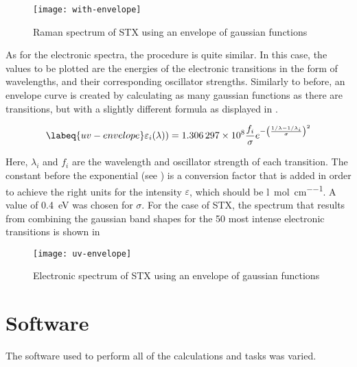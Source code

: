 \begin{figure}
    \centering
    \texttt{[image: with-envelope]}
    \caption[Raman spectrum with gaussian envelope]{Raman spectrum of STX using an envelope of gaussian functions}
\end{figure}

As for the electronic spectra, the procedure is quite similar.
In this case, the values to be plotted are the energies of the electronic transitions in the form of wavelengths, and their corresponding oscillator strengths.
Similarly to before, an envelope curve is created by calculating as many gaussian functions as there are transitions, but with a slightly different formula as displayed in .

\begin{equation}
    \labeq{uv-envelope}
    \varepsilon_i (\lambda)) = \num{1.306297e8} \frac{f_i}{\sigma} e^{-\left(\frac{1/\lambda - 1/\lambda_i}{\sigma}\right)^2}
\end{equation}

Here, $\lambda_i$ and $f_i$ are the wavelength and oscillator strength of each transition. The constant before the exponential (see ) is a conversion factor that is added in order to achieve the right units for the intensity $\varepsilon$, which should be \si{\litre\per\mole\per\cm}.
A value of \SI{0.4}{\eV} was chosen for $\sigma$.
For the case of STX, the spectrum that results from combining the gaussian band shapes for the 50 most intense electronic transitions is shown in 

\begin{figure}
    \centering
    \texttt{[image: uv-envelope]}
    \caption[Electronic spectrum with gaussian envelopes]{Electronic spectrum of STX using an envelope of gaussian functions}
\end{figure}


\section{Software}

The software used to perform all of the calculations and tasks was varied.

